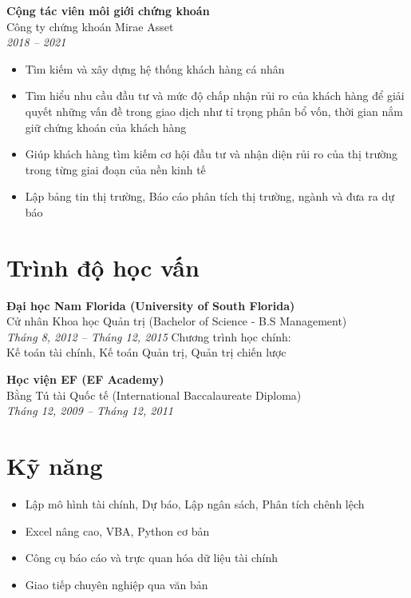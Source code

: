 \documentclass[a4paper,12pt]{article}
\begin{document}
\textbf{Cộng tác viên môi giới chứng khoán} \\
Công ty chứng khoán Mirae Asset \\
\textit{2018 -- 2021}
\begin{itemize}[leftmargin=0.5cm]
\item Tìm kiếm và xây dựng hệ thống khách hàng cá nhân
\item Tìm hiểu nhu cầu đầu tư và mức độ chấp nhận rủi ro của khách hàng để giải quyết những vấn đề trong giao dịch như tỉ trọng phân bổ vốn, thời gian nắm giữ chứng khoán của khách hàng
\item Giúp khách hàng tìm kiếm cơ hội đầu tư và nhận diện rủi ro của thị trường trong từng giai đoạn của nền kinh tế
\item Lập bảng tin thị trường, Báo cáo phân tích thị trường, ngành và đưa ra dự báo 
\end{itemize}

\section*{Trình độ học vấn}

\textbf{Đại học Nam Florida (University of South Florida)} \\
Cử nhân Khoa học Quản trị (Bachelor of Science - B.S Management) \\
\textit{Tháng 8, 2012 -- Tháng 12, 2015} \newline
Chương trình học chính: 
\\Kế toán tài chính, Kế toán Quản trị, Quản trị chiến lược 

\textbf{Học viện EF (EF Academy)} \\
Bằng Tú tài Quốc tế (International Baccalaureate Diploma) \\
\textit{Tháng 12, 2009 -- Tháng 12, 2011}

\section*{Kỹ năng}
\begin{itemize}[leftmargin=0.5cm]
    \item Lập mô hình tài chính, Dự báo, Lập ngân sách, Phân tích chênh lệch
    \item Excel nâng cao, VBA, Python cơ bản
    \item Công cụ báo cáo và trực quan hóa dữ liệu tài chính
    \item Giao tiếp chuyên nghiệp qua văn bản
\end{itemize}
\end{document}

